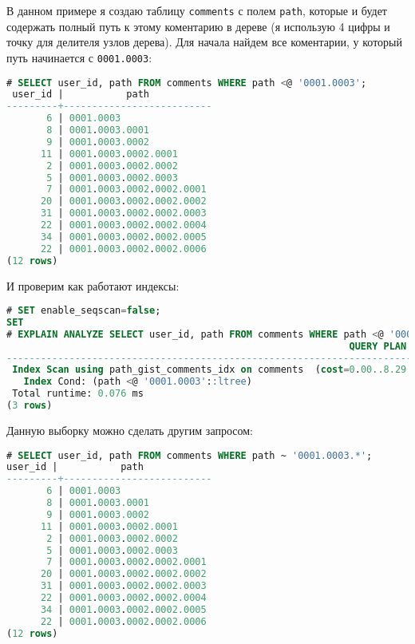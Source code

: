 В данном примере я создаю таблицу \lstinline!comments! с полем \lstinline!path!, которые и будет содержать полный путь к этому коментарию в дереве (я использую 4 цифры и точку для делителя узлов дерева). Для начала найдем все коментарии, у который путь начинается с \lstinline!0001.0003!:

\begin{lstlisting}[language=SQL,label=lst:pgltree4,caption=Ltree]
# SELECT user_id, path FROM comments WHERE path <@ '0001.0003';
 user_id |           path
---------+--------------------------
       6 | 0001.0003
       8 | 0001.0003.0001
       9 | 0001.0003.0002
      11 | 0001.0003.0002.0001
       2 | 0001.0003.0002.0002
       5 | 0001.0003.0002.0003
       7 | 0001.0003.0002.0002.0001
      20 | 0001.0003.0002.0002.0002
      31 | 0001.0003.0002.0002.0003
      22 | 0001.0003.0002.0002.0004
      34 | 0001.0003.0002.0002.0005
      22 | 0001.0003.0002.0002.0006
(12 rows)
\end{lstlisting}

И проверим как работают индексы:

\begin{lstlisting}[language=SQL,label=lst:pgltree5,caption=Ltree]
# SET enable_seqscan=false;
SET
# EXPLAIN ANALYZE SELECT user_id, path FROM comments WHERE path <@ '0001.0003';
                                                            QUERY PLAN
-----------------------------------------------------------------------------------------------------------------------------------
 Index Scan using path_gist_comments_idx on comments  (cost=0.00..8.29 rows=2 width=38) (actual time=0.023..0.034 rows=12 loops=1)
   Index Cond: (path <@ '0001.0003'::ltree)
 Total runtime: 0.076 ms
(3 rows)
\end{lstlisting}

Данную выборку можно сделать другим запросом:

\begin{lstlisting}[language=SQL,label=lst:pgltree6,caption=Ltree]
# SELECT user_id, path FROM comments WHERE path ~ '0001.0003.*';
user_id |           path
---------+--------------------------
       6 | 0001.0003
       8 | 0001.0003.0001
       9 | 0001.0003.0002
      11 | 0001.0003.0002.0001
       2 | 0001.0003.0002.0002
       5 | 0001.0003.0002.0003
       7 | 0001.0003.0002.0002.0001
      20 | 0001.0003.0002.0002.0002
      31 | 0001.0003.0002.0002.0003
      22 | 0001.0003.0002.0002.0004
      34 | 0001.0003.0002.0002.0005
      22 | 0001.0003.0002.0002.0006
(12 rows)
\end{lstlisting}


